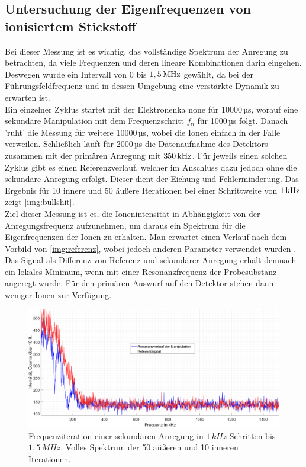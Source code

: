 \documentclass[numbers=noenddot,a4paper,notitlepage,twoside,BCOR15mm]{scrartcl}
\newcommand{\ix}[1]{_\text{#1}}
\begin{document}
		\subsection{Untersuchung der Eigenfrequenzen von ionisiertem Stickstoff}\label{subsec:mess}
		
		Bei dieser Messung ist es wichtig, das vollständige Spektrum der Anregung zu betrachten, da viele Frequenzen und deren lineare Kombinationen darin eingehen. Deswegen wurde ein Intervall von 0 bis $\unit[1,5]{MHz}$ gewählt, da bei der Führungsfeldfrequenz und in dessen Umgebung eine verstärkte Dynamik zu erwarten ist.\\
		Ein einzelner Zyklus startet mit der Elektronenka none für 10000\,µs, worauf eine sekundäre Manipulation mit dem Frequenzschritt $f\ix{n}$ für 1000\,µs folgt. Danach 'ruht' die Messung für weitere 10000\,µs, wobei die Ionen einfach in der Falle verweilen. Schließlich läuft für 2000\,µs die Datenaufnahme des Detektors zusammen mit der primären Anregung mit $\unit[350]{kHz}$. Für jeweils einen solchen Zyklus gibt es einen Referenzverlauf, welcher im Anschluss dazu jedoch ohne die sekundäre Anregung erfolgt. Dieser dient der Eichung und Fehlerminderung. Das Ergebnis für 10 innere und 50 äußere Iterationen bei einer Schrittweite von $\unit[1]{kHz}$ zeigt \autoref{img:bullshit}.\\
		Ziel dieser Messung ist es, die Ionenintensität in Abhängigkeit von der Anregungsfrequenz aufzunehmen, um daraus ein Spektrum für die Eigenfrequenzen der Ionen zu erhalten. Man erwartet einen Verlauf nach dem Vorbild von \autoref{img:referenz}, wobei jedoch anderen Parameter verwendet wurden \cite{Paul-FalleREF}. Das Signal als Differenz von Referenz und sekundärer Anregung erhält demnach ein lokales Minimum, wenn mit einer Resonanzfrequenz der Probesubstanz angeregt wurde. Für den primären Auswurf auf den Detektor stehen dann weniger Ionen zur Verfügung.
		
		\begin{figure}
			\includegraphics[width=\textwidth]{pics/volle_daten.png}
			\caption{Frequenziteration einer sekundären Anregung in $1\,kHz$-Schritten bis $1,5\,MHz$. Volles Spektrum der 50 aüßeren und 10 inneren Iterationen.}\label{img:bullshit}
		\end{figure}
		
\end{document}

